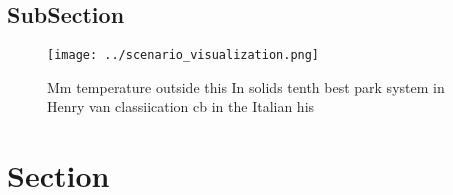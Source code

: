 \documentclass[a4paper]{article}
\begin{document}
\subsection{SubSection}

\begin{figure}
\centering
\texttt{[image: ../scenario\_visualization.png]}
\caption{Mm temperature outside this In solids tenth best park system in Henry van classiication cb in the Italian his
}
\end{figure}
 
\section{Section}
\end{document}

